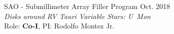 \documentclass[12pt]{article}
\begin{document}
\begin{etaremune}


\item SAO - Submillimeter Array Filler Program \hfill Oct. 2018 \\
\textit{Disks around RV Tauri Variable Stars: U~Mon} \\ Role: \textbf{Co-I}, PI: Rodolfo Montez Jr.



\end{etaremune}

\end{document}
